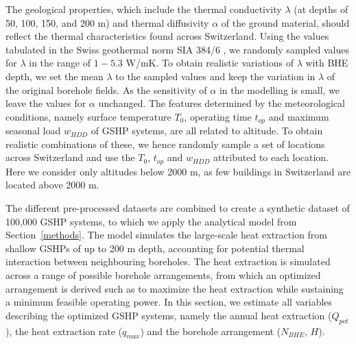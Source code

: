 The geological properties, which include the thermal conductivity $\lambda$ (at depths of 50, 100, 150, and 200 m) and thermal diffusivity $\alpha$ of the ground material, should reflect the thermal characteristics found across Switzerland. 
Using the values tabulated in the Swiss geothermal norm SIA 384/6 \cite{sia_sondes_2010}, we randomly sampled values for $\lambda$ in the range of $1 - 5.3$ W/mK. 
To obtain realistic variations of $\lambda$ with BHE depth, we set the mean $\lambda$ to the sampled values and keep the variation in $\lambda$ of the original borehole fields. 
As the sensitivity of $\alpha$ in the modelling is small, we leave the values for $\alpha$ unchanged. 
The features determined by the meteorological conditions, namely surface temperature $T_0$, operating time $t_{op}$ and maximum seasonal load $w_{HDD}$ of GSHP systems, are all related to altitude. 
To obtain realistic combinations of these, we hence randomly sample a set of locations across Switzerland and use the $T_0$, $t_{op}$ and $w_{HDD}$ attributed to each location. 
Here we consider only altitudes below 2000 m, as few buildings in Switzerland are located above 2000 m.

The different pre-processed datasets are combined to create a synthetic dataset of 100,000 GSHP systems, to which we apply the analytical model from Section~\ref{methods}. The model simulates the large-scale heat extraction from shallow GSHPs of up to 200 m depth, accounting for potential thermal interaction between neighbouring boreholes. The heat extraction is simulated across a range of possible borehole arrangements, from which an optimized arrangement is derived such as to maximize the heat extraction while sustaining a minimum feasible operating power. In this section, we estimate all variables describing the optimized GSHP systems, namely the annual heat extraction ($Q_{pot}$), the heat extraction rate ($q_{max}$) and the borehole arrangement ($N_{BHE}$, $H$).

